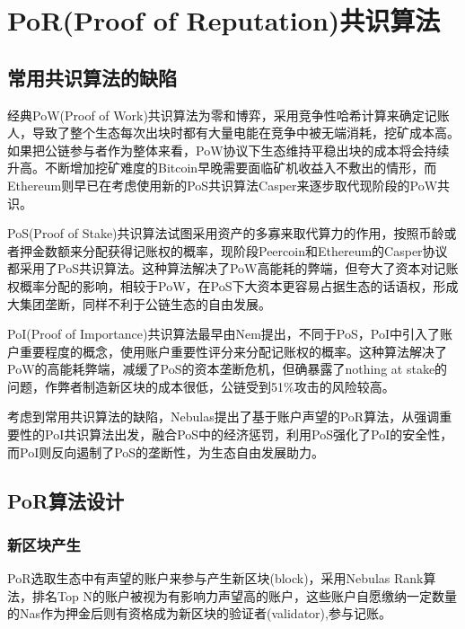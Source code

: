 \section{PoR(Proof of Reputation)共识算法}
\label{sec:por}

\subsection{常用共识算法的缺陷}
\label{por:weakness}

经典PoW(Proof of Work)共识算法为零和博弈，采用竞争性哈希计算来确定记账人，导致了整个生态每次出块时都有大量电能在竞争中被无端消耗，挖矿成本高。如果把公链参与者作为整体来看，PoW协议下生态维持平稳出块的成本将会持续升高。不断增加挖矿难度的Bitcoin早晚需要面临矿机收益入不敷出的情形，而Ethereum则早已在考虑使用新的PoS共识算法Casper\cite{casper}来逐步取代现阶段的PoW共识\cite{buterin2013ethereum}。

PoS(Proof of Stake)共识算法试图采用资产的多寡来取代算力的作用，按照币龄或者押金数额来分配获得记账权的概率，现阶段Peercoin\cite{king2012peercoin}和Ethereum的Casper协议都采用了PoS共识算法。这种算法解决了PoW高能耗的弊端，但夸大了资本对记账权概率分配的影响，相较于PoW，在PoS下大资本更容易占据生态的话语权，形成大集团垄断，同样不利于公链生态的自由发展。

PoI(Proof of Importance)共识算法最早由Nem提出\cite{nem}，不同于PoS，PoI中引入了账户重要程度的概念，使用账户重要性评分来分配记账权的概率。这种算法解决了PoW的高能耗弊端，减缓了PoS的资本垄断危机，但确暴露了nothing at stake的问题，作弊者制造新区块的成本很低，公链受到51\%攻击的风险较高。

考虑到常用共识算法的缺陷，Nebulas提出了基于账户声望的PoR算法，从强调重要性的PoI共识算法出发，融合PoS中的经济惩罚，利用PoS强化了PoI的安全性，而PoI则反向遏制了PoS的垄断性，为生态自由发展助力。

\subsection{PoR算法设计}
\label{por:design}

\subsubsection{新区块产生}
\label{por:design:block}

PoR选取生态中有声望的账户来参与产生新区块(block)，采用Nebulas Rank算法，排名Top N的账户被视为有影响力声望高的账户，这些账户自愿缴纳一定数量的Nas作为押金后则有资格成为新区块的验证者(validator),参与记账。

